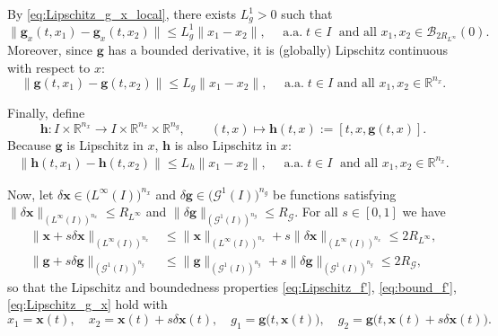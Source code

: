 \documentclass[onefignum,onetabnum]{siamart220329}
\numberwithin{equation}{section}
\newcommand{\aall}{\mbox{ a.a.} \;}
\newcommand {\real} {\mathbb{R}}
\newcommand{\bg}{\ensuremath{\mathbf{g}}} %
\newcommand{\bh}{\ensuremath{\mathbf{h}}} %
\newcommand{\bx}{\ensuremath{\mathbf{x}}} %
\newcommand {\cB} {\mathcal{B}}
\newcommand {\cG} {\mathcal{G}}
\newcommand{\LL}{\big(L^\infty(I) \big)^{n_x}}
\begin{document}
\begin{appendix}
    By \cref{eq:Lipschitz_g_x_local}, there exists $L_g^1 > 0$ such that
    \begin{equation}  \label{eq:Lipschitz_g_x}
    	\| \bg_x(t, x_1) - \bg_x(t, x_2) \| \leq L_g^1 \| x_1 - x_2 \|, 
	\quad \aall t \in I \;   \mbox{ and all }  x_1, x_2 \in \cB_{2 R_{L^\infty}}(0).
    \end{equation}
   Moreover, since $\bg$ has a bounded derivative, it is (globally) Lipschitz continuous with respect to $x$:
    \begin{equation*}
    	\| \bg(t, x_1) - \bg(t, x_2) \| \leq L_g \| x_1 - x_2 \|,  \quad  \aall t \in I \mbox{ and all }  x_1, x_2 \in \real^{n_x}.
    \end{equation*}
       
    Finally, define 
    \begin{equation*}
    	\bh: I \times \real^{n_x} \rightarrow  I \times  \real^{n_x} \times \real^{n_g}, \qquad
	(t,x) \mapsto \bh(t, x) := [t, x, \bg(t,x)].
    \end{equation*}
   Because $\bg$ is Lipschitz in $x$, $\bh$ is also Lipschitz in $x$:
    \begin{align}  \label{eq:Lipschitz_h}
    	\| \bh(t, x_1) - \bh(t, x_2) \| \leq L_h \| x_1 - x_2 \|,  \quad \aall t \in I \;   \mbox{ and all }  x_1, x_2 \in \real^{n_x}.
    \end{align}
    
    \sloppy Now, let  $\delta \bx \in \LL$ and $\delta \bg \in \big(\cG^1(I)\big)^{n_g}$ be functions satisfying 
    $\| \delta \bx \|_{(L^\infty(I))^{n_x}}\leq R_{L^\infty}$ and $\| \delta \bg \|_{(\cG^1(I))^{n_g}} \leq R_\cG$. 
    For all $s \in [0, 1]$ we have
    \begin{align*}
    	\| \bx + s\delta \bx \|_{(L^\infty(I))^{n_x}}&\leq \| \bx \|_{(L^\infty(I))^{n_x}}+ s \| \delta \bx \|_{(L^\infty(I))^{n_x}}\leq 2 R_{L^\infty}, \\
        \| \bg + s \delta \bg \|_{(\cG^1(I))^{n_g}} &\leq \| \bg \|_{(\cG^1(I))^{n_g}} + s \| \delta \bg \|_{(\cG^1(I))^{n_g}}  \leq 2 R_\cG,
    \end{align*}
    so that the Lipschitz and boundedness properties  \cref{eq:Lipschitz_f'}, \cref{eq:bound_f'}, \cref{eq:Lipschitz_g_x} 
    hold with $$x_1 = \bx(t), \quad x_2 = \bx(t) + s\delta \bx(t), \quad g_1 = \bg\big(t, \bx(t)\big), \quad g_2 = \bg\big(t, \bx(t) + s\delta \bx(t)\big).$$


\end{appendix}
\end{document}
